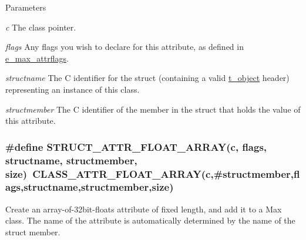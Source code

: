 \begin{DoxyParams}{Parameters}
\item[{\em c}]The class pointer. \item[{\em flags}]Any flags you wish to declare for this attribute, as defined in \hyperlink{group__attr_gaf296cfc6741bb19207f6ed8062809115}{e\_\-max\_\-attrflags}. \item[{\em structname}]The C identifier for the struct (containing a valid \hyperlink{structt__object}{t\_\-object} header) representing an instance of this class. \item[{\em structmember}]The C identifier of the member in the struct that holds the value of this attribute. \end{DoxyParams}
\hypertarget{group__attr_ga5b7d0da905adfd22f42b4a41721286a0}{
\subsubsection[{STRUCT\_\-ATTR\_\-FLOAT\_\-ARRAY}]{\setlength{\rightskip}{0pt plus 5cm}\#define STRUCT\_\-ATTR\_\-FLOAT\_\-ARRAY(c, \/  flags, \/  structname, \/  structmember, \/  size)~CLASS\_\-ATTR\_\-FLOAT\_\-ARRAY(c,\#structmember,flags,structname,structmember,size)}}
\label{group__attr_ga5b7d0da905adfd22f42b4a41721286a0}


Create an array-\/of-\/32bit-\/floats attribute of fixed length, and add it to a Max class. The name of the attribute is automatically determined by the name of the struct member.


